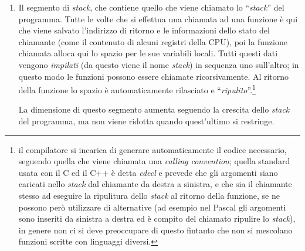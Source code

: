 \begin{enumerate}
\begin{itemize}
    cui valore non è stato assegnato esplicitamente. Ad esempio se si
    definisce:
    questo vettore sarà immagazzinato in questo segmento. Anch'esso viene
    allocato all'avvio, e tutte le variabili vengono inizializzate a zero (ed
    i puntatori a ).\footnote{si ricordi che questo vale solo per le
      variabili che vanno nel segmento dati, e non è affatto vero in
      generale.}  Storicamente questa seconda parte del segmento dati viene
    chiamata  BSS (da \textit{Block
      Started by Symbol}). La sua dimensione è fissa.
     
  \item Lo \textit{heap}, detto anche \textit{free store}. Tecnicamente lo si
    può considerare l'estensione del segmento dei dati non inizializzati, a
    cui di solito è posto giusto di seguito. Questo è il segmento che viene
    utilizzato per l'allocazione dinamica della memoria.  Lo \textit{heap} può
    essere ridimensionato allargandolo e restringendolo per allocare e
    disallocare la memoria dinamica con le apposite funzioni (vedi
    sez.~\ref{sec:proc_mem_alloc}), ma il suo limite inferiore, quello
    adiacente al segmento dei dati non inizializzati, ha una posizione fissa.
  \end{itemize}
\item Il segmento di \textit{stack}, che contiene quello che viene chiamato lo
  ``\textit{stack}'' del programma.  Tutte le volte che si effettua una
  chiamata ad una funzione è qui che viene salvato l'indirizzo di ritorno e le
  informazioni dello stato del chiamante (come il contenuto di alcuni registri
  della CPU), poi la funzione chiamata alloca qui lo spazio per le sue
  variabili locali. Tutti questi dati vengono \textit{impilati} (da questo
  viene il nome \textit{stack}) in sequenza uno sull'altro; in questo modo le
  funzioni possono essere chiamate ricorsivamente. Al ritorno della funzione
  lo spazio è automaticamente rilasciato e ``\textsl{ripulito}''.\footnote{il
    compilatore si incarica di generare automaticamente il codice necessario,
    seguendo quella che viene chiamata una \textit{calling convention}; quella
    standard usata con il C ed il C++ è detta \textit{cdecl} e prevede che gli
    argomenti siano caricati nello \textit{stack} dal chiamante da destra a
    sinistra, e che sia il chiamante stesso ad eseguire la ripulitura dello
    \textit{stack} al ritorno della funzione, se ne possono però utilizzare di
    alternative (ad esempio nel Pascal gli argomenti sono inseriti da sinistra
    a destra ed è compito del chiamato ripulire lo \textit{stack}), in genere
    non ci si deve preoccupare di questo fintanto che non si mescolano
    funzioni scritte con linguaggi diversi.}

  La dimensione di questo segmento aumenta seguendo la crescita dello
  \textit{stack} del programma, ma non viene ridotta quando quest'ultimo si
  restringe.
\end{enumerate}

